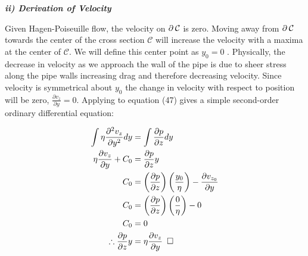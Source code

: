 \documentclass[titlepage]{article}
\begin{document}
    \begin{center}
        \textbf{\emph{ii) Derivation of Velocity}}
    \end{center}

    \noindent \noindent Given Hagen-Poiseuille flow, the velocity on $\partial\hspace*{2pt}\mathcal{C}$ is zero. Moving away from $\partial\hspace*{2pt}\mathcal{C}$ towards the center of the cross section $\mathcal{C}$ will increase the velocity with a maxima at the center of $\mathcal{C}$. We will define this center point as $y_{0}=0$ . Physically, the decrease in velocity as we approach the wall of the pipe is due to sheer stress along the pipe walls increasing drag and therefore decreasing velocity. Since velocity is symmetrical about $y_{0}$ the change in velocity with respect to position will be zero, $\displaystyle\frac{\partial{v_{z}}}{\partial{y}} = 0$. Applying to equation (47) gives a simple second-order ordinary differential equation:

    \begingroup
        \addtolength\jot{6pt}
        \begin{align}
            \int{\eta\displaystyle\frac{\partial^2{v_{z}}}{\partial{y}^2}dy}&=\int{\displaystyle\frac{\partial{p}}{\partial{z}}dy}\\
            \eta\displaystyle\frac{\partial{v_{z}}}{\partial{y}} + C_{0}&=\displaystyle\frac{\partial{p}}{\partial{z}}y \\
            C_{0} &=  \left(\displaystyle\frac{\partial{p}}{\partial{z}}\right)\left(\displaystyle\frac{y_{0}}{\eta}\right) - \displaystyle\frac{\partial{v_{z_{0}}}}{\partial{y}} \\
            C_{0} &=  \left(\displaystyle\frac{\partial{p}}{\partial{z}}\right)\left(\displaystyle\frac{0}{\eta}\right) - 0 \\
            C_{0} &=  0 \\
            \therefore \displaystyle\frac{\partial{p}}{\partial{z}}y&=\eta\displaystyle\frac{\partial{v_{z}}}{\partial{y}} \hspace*{5pt}\square 
        \end{align}
        
\end{document}

